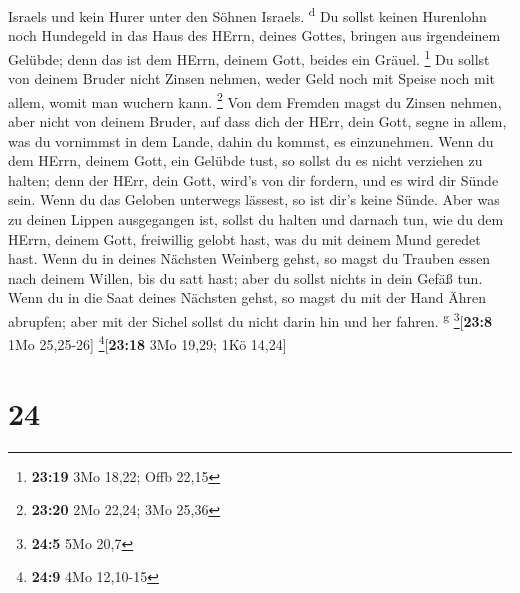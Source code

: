 Israels und kein Hurer unter den Söhnen Israels. \textsuperscript{d}
 Du sollst keinen Hurenlohn noch Hundegeld in das Haus
des HErrn, deines Gottes, bringen aus irgendeinem Gelübde; denn das ist
dem HErrn, deinem Gott, beides ein Gräuel. \footnote{\textbf{23:19} 3Mo
  18,22; Offb 22,15}  Du sollst von deinem Bruder nicht
Zinsen nehmen, weder Geld noch mit Speise noch mit allem, womit man
wuchern kann. \footnote{\textbf{23:20} 2Mo 22,24; 3Mo 25,36}
 Von dem Fremden magst du Zinsen nehmen, aber nicht von
deinem Bruder, auf dass dich der HErr, dein Gott, segne in allem, was du
vornimmst in dem Lande, dahin du kommst, es einzunehmen. 
Wenn du dem HErrn, deinem Gott, ein Gelübde tust, so sollst du es nicht
verziehen zu halten; denn der HErr, dein Gott, wird's von dir fordern,
und es wird dir Sünde sein.  Wenn du das Geloben
unterwegs lässest, so ist dir's keine Sünde.  Aber was zu
deinen Lippen ausgegangen ist, sollst du halten und darnach tun, wie du
dem HErrn, deinem Gott, freiwillig gelobt hast, was du mit deinem Mund
geredet hast.  Wenn du in deines Nächsten Weinberg gehst,
so magst du Trauben essen nach deinem Willen, bis du satt hast; aber du
sollst nichts in dein Gefäß tun.  Wenn du in die Saat
deines Nächsten gehst, so magst du mit der Hand Ähren abrupfen; aber mit
der Sichel sollst du nicht darin hin und her fahren. \textsuperscript{g}
\footnote{\textbf{24:5} 5Mo 20,7}{[}\textbf{23:8} 1Mo 25,25-26{]}
\footnote{\textbf{24:9} 4Mo 12,10-15}{[}\textbf{23:18} 3Mo 19,29; 1Kö
14,24{]}

\hypertarget{section-23}{%
\section{24}\label{section-23}}

